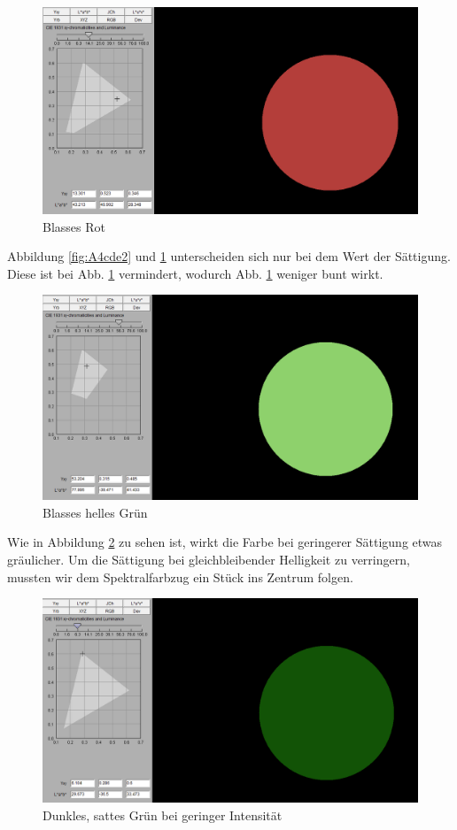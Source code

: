 \documentclass[a4paper]{article}
\begin{document}
\begin{figure}[H]
    \centering
    \includegraphics[width=0.7\columnwidth]{images/A4_cde_BlassesRot.PNG}
    \caption{Blasses Rot}
    \label{fig:A4cde3}
\end{figure}

Abbildung \ref{fig:A4cde2} und \ref{fig:A4cde3} unterscheiden sich nur bei dem Wert der Sättigung. Diese ist bei Abb. \ref{fig:A4cde3} vermindert, wodurch Abb. \ref{fig:A4cde3} weniger bunt wirkt. 

\begin{figure}[H]
    \centering
    \includegraphics[width=0.7\columnwidth]{images/A4_cde_BlassesHellesGruen.PNG}
    \caption{Blasses helles Grün}
    \label{fig:A4cde4}
\end{figure}

\noindent Wie in Abbildung \ref{fig:A4cde4} zu sehen ist, wirkt die Farbe bei geringerer Sättigung etwas gräulicher. Um die Sättigung bei gleichbleibender Helligkeit zu verringern, mussten wir dem Spektralfarbzug ein Stück ins Zentrum folgen.

\begin{figure}[H]
    \centering
    \includegraphics[width=0.7\columnwidth]{images/A4_cde_DunklesSattesGruen}
    \caption{Dunkles, sattes Grün bei geringer Intensität}
    \label{fig:A4cde5}
\end{figure}
\end{document}
